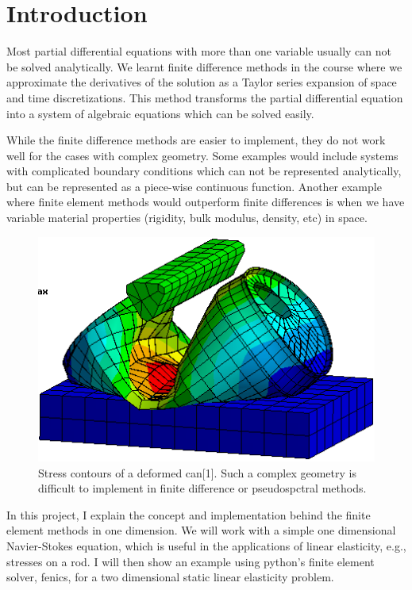 \documentclass{article}
\begin{document}
\section{Introduction}
Most partial differential equations with more than one variable usually can not be solved analytically. We learnt finite difference methods in the course where we approximate the derivatives of the solution as a Taylor series expansion of space and time discretizations. This method transforms the partial differential equation into a system of algebraic equations which can be solved easily. 

While the finite difference methods are easier to implement, they do not work well for the cases with complex geometry. Some examples would include systems with complicated boundary conditions which can not be represented analytically, but can be represented as a piece-wise continuous function. Another example where finite element methods would outperform finite differences is when we have variable material properties (rigidity, bulk modulus, density, etc) in space.

\begin{figure}[!htb]
    \centering
    \includegraphics[scale=0.5]{fig1.png}
    \caption{Stress contours of a deformed can[1]. Such a complex geometry is difficult to implement in finite difference or pseudospctral methods.}
\end{figure}

In this project, I explain the concept and implementation behind the finite element methods in one dimension. We will work with a simple one dimensional Navier-Stokes equation, which is useful in the applications of linear elasticity, e.g., stresses on a rod. I will then show an example using python's finite element solver, fenics, for a two dimensional static linear elasticity problem.
\end{document}
